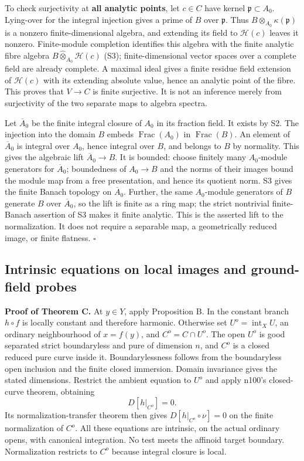 \documentclass[
  11pt,
]{article}
\begin{document}
To check surjectivity at \textbf{all analytic points}, let \(c\in C\)
have kernel \(\mathfrak p\subset A_0\). Lying-over for the integral
injection gives a prime of \(B\) over \(\mathfrak p\). Thus
\(B\otimes_{A_0}\kappa(\mathfrak p)\) is a nonzero finite-dimensional
algebra, and extending its field to \(\mathcal H(c)\) leaves it nonzero.
Finite-module completion identifies this algebra with the finite
analytic fibre algebra \(B\widehat\otimes_{A_0}\mathcal H(c)\) (S3);
finite-dimensional vector spaces over a complete field are already
complete. A maximal ideal gives a finite residue field extension of
\(\mathcal H(c)\) with its extending absolute value, hence an analytic
point of the fibre. This proves that \(V\to C\) is finite surjective. It
is not an inference merely from surjectivity of the two separate maps to
algebra spectra.

Let \(\overline A_0\) be the finite integral closure of \(A_0\) in its
fraction field. It exists by S2. The injection into the domain \(B\)
embeds \(\operatorname{Frac}(A_0)\) in \(\operatorname{Frac}(B)\). An
element of \(\overline A_0\) is integral over \(A_0\), hence integral
over \(B\), and belongs to \(B\) by normality. This gives the algebraic
lift \(\overline A_0\to B\). It is bounded: choose finitely many
\(A_0\)-module generators for \(\overline A_0\); boundedness of
\(A_0\to B\) and the norms of their images bound the module map from a
free presentation, and hence its quotient norm. S3 gives the finite
Banach topology on \(\overline A_0\). Further, the same \(A_0\)-module
generators of \(B\) generate \(B\) over \(\overline A_0\), so the lift
is finite as a ring map; the strict nontrivial finite-Banach assertion
of S3 makes it finite analytic. This is the asserted lift to the
normalization. It does not require a separable map, a geometrically
reduced image, or finite flatness. \(\square\)

\subsection{Intrinsic equations on local images and ground-field
probes}\label{intrinsic-equations-on-local-images-and-ground-field-probes}

\textbf{Proof of Theorem C.} At \(y\in Y\), apply Proposition B. In the
constant branch \(h\circ f\) is locally constant and therefore harmonic.
Otherwise set \(U^o=\operatorname{int}_X U\), an ordinary neighbourhood
of \(x=f(y)\), and \(C^o=C\cap U^o\). The open \(U^o\) is good separated
strict boundaryless and pure of dimension \(n\), and \(C^o\) is a closed
reduced pure curve inside it. Boundarylessness follows from the
boundaryless open inclusion and the finite closed immersion. Domain
invariance gives the stated dimensions. Restrict the ambient equation to
\(U^o\) and apply n100's closed-curve theorem, obtaining \[
                         D[h|_{C^o}]=0.
\] Its normalization-transfer theorem then gives
\(D[h|_{C^o}\circ\nu]=0\) on the finite normalization of \(C^o\). All
these equations are intrinsic, on the actual ordinary opens, with
canonical integration. No test meets the affinoid target boundary.
Normalization restricts to \(C^o\) because integral closure is local.
\end{document}
